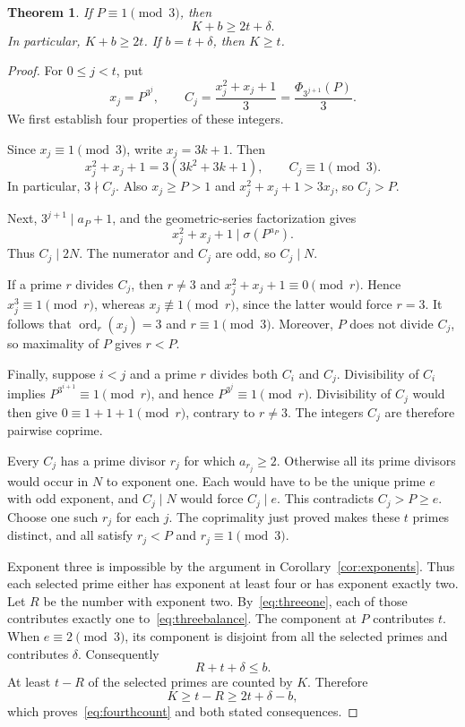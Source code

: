 \documentclass[11pt]{article}
\newtheorem{theorem}{Theorem}
\theoremstyle{remark}
\DeclareMathOperator{\ord}{ord}
\begin{document}
\begin{theorem}\label{thm:fourthcount}
If $P\equiv1\pmod3$, then
\begin{equation}\label{eq:fourthcount}
 \boxed{K+b\ge2t+\delta.}
\end{equation}
In particular, $K+b\ge2t$. If $b=t+\delta$, then $K\ge t$.
\end{theorem}
\begin{proof}
For $0\le j<t$, put
\[
 x_j=P^{3^j},\qquad
 C_j=\frac{x_j^2+x_j+1}{3}=\frac{\Phi_{3^{j+1}}(P)}{3}.
\]
We first establish four properties of these integers.

Since $x_j\equiv1\pmod3$, write $x_j=3k+1$. Then
\[
 x_j^2+x_j+1=3(3k^2+3k+1),\qquad C_j\equiv1\pmod3.
\]
In particular, $3\nmid C_j$. Also $x_j\ge P>1$ and
$x_j^2+x_j+1>3x_j$, so $C_j>P$.

Next, $3^{j+1}\mid a_P+1$, and the geometric-series factorization gives
\[
 x_j^2+x_j+1\mid\sigma(P^{a_P}).
\]
Thus $C_j\mid2N$. The numerator and $C_j$ are odd, so $C_j\mid N$.

If a prime $r$ divides $C_j$, then $r\ne3$ and
$x_j^2+x_j+1\equiv0\pmod r$. Hence $x_j^3\equiv1\pmod r$, whereas
$x_j\not\equiv1\pmod r$, since the latter would force $r=3$.
It follows that $\ord_r(x_j)=3$ and $r\equiv1\pmod3$.
Moreover, $P$ does not divide $C_j$, so maximality of $P$ gives $r<P$.

Finally, suppose $i<j$ and a prime $r$ divides both $C_i$ and $C_j$.
Divisibility of $C_i$ implies $P^{3^{i+1}}\equiv1\pmod r$, and hence
$P^{3^j}\equiv1\pmod r$. Divisibility of $C_j$ would then give
$0\equiv1+1+1\pmod r$, contrary to $r\ne3$. The integers $C_j$
are therefore pairwise coprime.

Every $C_j$ has a prime divisor $r_j$ for which $a_{r_j}\ge2$.
Otherwise all its prime divisors would occur in $N$ to exponent one. Each
would have to be the unique prime $e$ with odd exponent, and $C_j\mid N$
would force $C_j\mid e$. This contradicts $C_j>P\ge e$.
Choose one such $r_j$ for each $j$. The coprimality just proved makes these
$t$ primes distinct, and all satisfy $r_j<P$ and $r_j\equiv1\pmod3$.

Exponent three is impossible by the argument in Corollary~\ref{cor:exponents}.
Thus each selected prime either has exponent at least four or has exponent
exactly two. Let $R$ be the number with exponent two. By~\eqref{eq:threeone},
each of those contributes exactly one to~\eqref{eq:threebalance}.
The component at $P$ contributes $t$. When $e\equiv2\pmod3$, its component
is disjoint from all the selected primes and contributes $\delta$.
Consequently
\[
 R+t+\delta\le b.
\]
At least $t-R$ of the selected primes are counted by $K$. Therefore
\[
 K\ge t-R\ge2t+\delta-b,
\]
which proves~\eqref{eq:fourthcount} and both stated consequences.
\end{proof}
\end{document}

